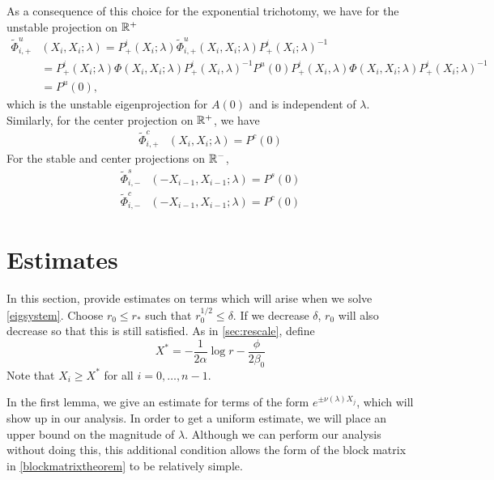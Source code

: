 \documentclass[thesis.tex]{subfiles}
\begin{document}
As a consequence of this choice for the exponential trichotomy, we have for the unstable projection on $\mathbb{R}^+$
\begin{align*}
\tilde{\Phi}_{i,+}^{u}&(X_i, X_i ; \lambda) = P^i_+(X_i; \lambda) \tilde{\Phi}_{i,+}^{u}(X_i, X_i; \lambda) P^i_+(X_i; \lambda)^{-1} \\
&= P^i_+(X_i; \lambda) \Phi(X_i, X_i; \lambda) P^i_+(X_i, \lambda)^{-1}
P^u(0) P^i_+(X_i, \lambda) \Phi(X_i, X_i; \lambda) P^i_+(X_i; \lambda)^{-1} \\
&= P^u(0),
\end{align*}
which is the unstable eigenprojection for $A(0)$ and is independent of $\lambda$. Similarly, for the center projection on $\mathbb{R}^+$, we have
\begin{align*}
\tilde{\Phi}_{i,+}^{c}&(X_i, X_i ; \lambda) = P^c(0)
\end{align*}
For the stable and center projections on $\mathbb{R}^-$,
\begin{align*}
\tilde{\Phi}_{i,-}^{s}&(-X_{i-1}, X_{i-1} ; \lambda) = P^s(0) \\
\tilde{\Phi}_{i,-}^{c}&(-X_{i-1}, X_{i-1} ; \lambda) = P^c(0)
\end{align*}

\section{Estimates}

In this section, provide estimates on terms which will arise when we solve \cref{eigsystem}. Choose $r_0 \leq r_*$ such that $r_0^{1/2} \leq \delta$. If we decrease $\delta$, $r_0$ will also decrease so that this is still satisfied. As in \cref{sec:rescale}, define
\begin{equation}\label{Xstarstab}
X^* = -\frac{1}{2\alpha}\log r - \frac{\phi}{2\beta_0}
\end{equation}Note that $X_i \geq X^*$ for all $i = 0, \dots, n-1$.

In the first lemma, we give an estimate for terms of the form $e^{\pm \nu(\lambda) X_j}$, which will show up in our analysis. In order to get a uniform estimate, we will place an upper bound on the magnitude of $\lambda$. Although we can perform our analysis without doing this, this additional condition allows the form of the block matrix in \cref{blockmatrixtheorem} to be relatively simple. 
\end{document}
